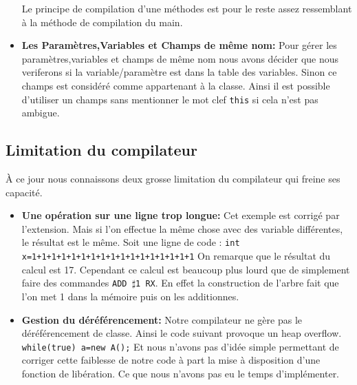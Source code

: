 \documentclass{article}
\begin{document}
\begin{itemize}
\newline 
Le principe de compilation d'une méthodes est pour le reste assez ressemblant à la méthode de compilation du main.
\item \textbf{Les Paramètres,Variables et Champs de même nom:}
\newline
Pour gérer les paramètres,variables et champs de même nom nous avons décider que nous veriferons si la variable/paramètre est dans la table des variables. Sinon ce champs est considéré comme appartenant à la classe. Ainsi il est possible d'utiliser un champs sans mentionner le mot clef \texttt{this} si cela n'est pas ambigue. 
\end{itemize}
\subsection{Limitation du compilateur}
À ce jour nous connaissons deux grosse limitation du compilateur qui freine ses capacité. 
\begin{itemize}
\item \textbf{Une opération sur une ligne trop longue:} 
\newline
Cet exemple est corrigé par l'extension. Mais si l'on effectue la même chose avec des variable différentes, le résultat est le même. Soit une ligne de code : \newline
\texttt {int x=1+1+1+1+1+1+1+1+1+1+1+1+1+1+1+1+1}
\newline
On remarque que le résultat du calcul est 17. Cependant ce calcul est beaucoup plus lourd que de simplement faire des commandes \texttt{ADD $\sharp$1  RX}. En effet la construction de l'arbre fait que l'on met 1 dans la mémoire puis on les additionnes.
\item \textbf{Gestion du déréférencement:} 
\newline
Notre compilateur ne gère pas le déréférencement de classe. Ainsi le code suivant provoque un heap overflow. 
\newline
\texttt{while(true) a=new A();}
Et nous n'avons pas d'idée simple permettant de corriger cette faiblesse de notre code à part la mise à disposition d'une fonction de libération. Ce que nous n'avons pas eu le temps d'implémenter.
\end{itemize}
\end{document}
